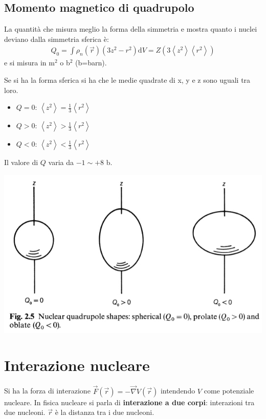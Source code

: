 \documentclass[a4paper,11pt,twoside,openany]{book}
\theoremstyle{definition}
\theoremstyle{plain}
\theoremstyle{plain}
\theoremstyle{definition}
\begin{document}
\section{Momento magnetico di quadrupolo} %
La quantità che misura meglio la forma della simmetria e mostra quanto i nuclei deviano dalla simmetria sferica è:
\begin{equation}\begin{split}
Q_0=\int{\rho_n\left(\vec r\right)\left(3z^2-r^2\right)\textrm{d}V}=Z\left(3\left\langle z^2 \right\rangle\left\langle r^2 \right\rangle\right)
\end{split}\end{equation}
e si misura in m$^2$ o b$^2$ (b=barn).

Se si ha la forma sferica si ha che le medie quadrate di x, y e z sono uguali tra loro.
\begin{itemize}
\item $Q=0$: $\left\langle z^2 \right\rangle=\frac{1}{3}\left\langle r^2 \right\rangle$
\item $Q>0$: $\left\langle z^2 \right\rangle>\frac{1}{3}\left\langle r^2 \right\rangle$
\item $Q<0$: $\left\langle z^2 \right\rangle<\frac{1}{3}\left\langle r^2 \right\rangle$
\end{itemize}
Il valore di $Q$ varia da $-1\sim+8$ b.

\begin{center}
\includegraphics[width=\textwidth]{immagini/quadrupole.jpg} %
\end{center}

\chapter{Interazione nucleare} %
Si ha la forza di interazione $\vec F\left(\vec r\right)=-\vec \nabla V\left(\vec r\right)$ intendendo $V$ come potenziale nucleare. In fisica nucleare si parla di \textbf{interazione a due corpi}: interazioni tra due nucleoni. $\vec r$ è la distanza tra i due nucleoni.
\end{document}

